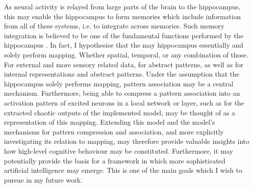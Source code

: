 
As neural activity is relayed from large parts of the brain to the hippocampus, this may enable the hippocampus to form memories which include information from all of these systems, i.e. to integrate across memories. Such memory integration is believed to be one of the fundamental functions performed by the hippocampus \citep{Rolls1998chpt1}.
In fact, I hypothesise that the may hippocampus essentially and solely perform mapping. Whether spatial, temporal, or any combination of those. For external and more sensory related data, for abstract patterns, as well as for internal representations and abstract patterns.
Under the assumption that the hippocampus solely performs mapping, pattern association may be a central mechanism. Furthermore, being able to compress a pattern association into an activation pattern of excited neurons in a local network or layer, such as for the extracted chaotic outputs of the implemented model, may be thought of as a representation of this mapping.
Extending this model and the model's mechanisms for pattern compression and association, and more explicitly investigating its relation to mapping, may therefore provide valuable insights into how high-level cognitive behaviour may be constituted. Furthermore, it may potentially provide the basis for a framework in which more sophisticated artificial intelligence may emerge. This is one of the main goals which I wish to pursue in my future work.
\\

